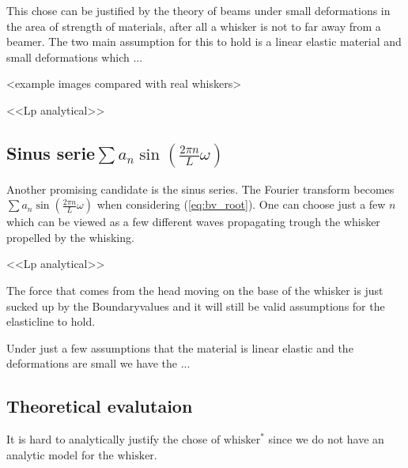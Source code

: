     This chose can be justified by the theory of beams under small deformations 
    in the area of strength of materials, after all a whisker is not to far 
    away from a beamer\cite{Hallfasthet}. The two main assumption
    for this to hold is a linear elastic material and small deformations which
    ...

    <example images compared with real whiskers>

    <<Lp analytical>>

\subsection{Sinus serie$\sum{a_n\sin (\frac{2\pi n}{L}\omega)}$}
    Another promising candidate is the sinus series.
    The Fourier transform becomes $\sum{a_n\sin (\frac{2\pi n}{L}\omega)}$ when
    considering (\ref{eq:bv_root}). One can choose just a few $n$ which can be
    viewed as a few different waves propagating trough the whisker propelled by
    the whisking. 

    <<Lp analytical>>


The force that comes from the head moving on the base of the whisker is just 
sucked up by the Boundaryvalues and it will still be valid assumptions for the
elasticline to hold.

Under just a few assumptions that the material is linear elastic and the
deformations are small we have the ...

\subsection{Theoretical evalutaion}
    It is hard to analytically justify the chose of $\text{whisker}^*$ since we do not
    have an analytic model for the $\text{whisker}$.


